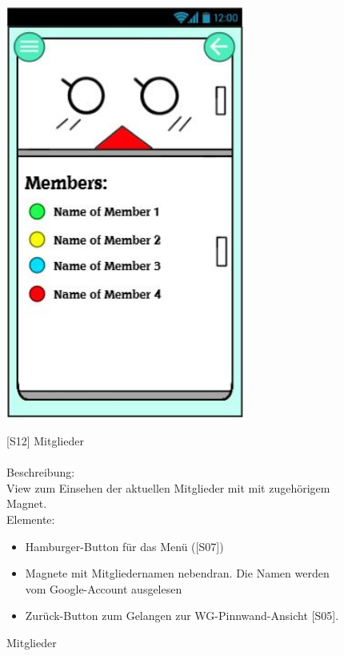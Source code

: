 \documentclass[a4paper]{scrreprt}
\begin{document}
    	\begin{figure}[h!]
    		\begin{minipage}[t]{0.35\linewidth}
    			\flushright
    			\centering
    			\vspace{9mm}
    			\includegraphics[width=0.7\textwidth]{fridget_members.JPG}
    			\caption{Mitglieder}
    			\label{fig:figure1}
    		\end{minipage}
    		\hspace{0.5cm}
    		\begin{minipage}[t]{0.65\linewidth}
    			\flushleft
    			\vspace{9mm}
    			{[}S12{]} Mitglieder \\
    			\hfill
    			\\
    			Beschreibung: \\
    			View zum Einsehen der aktuellen Mitglieder mit
    			mit zugehörigem Magnet.\\
    			\hfill
    			Elemente:\\
    			\begin{itemize}
    				\renewcommand\labelitemi{--}
    				\item Hamburger-Button für das Menü ({[}S07{]})
    				\item Magnete mit Mitgliedernamen nebendran.
    				Die Namen werden vom Google-Account
    				ausgelesen
    				\item Zurück-Button zum Gelangen zur
    				WG-Pinnwand-Ansicht {[}S05{]}.
    				

\end{itemize}
\end{minipage}
\end{figure}
\end{document}
